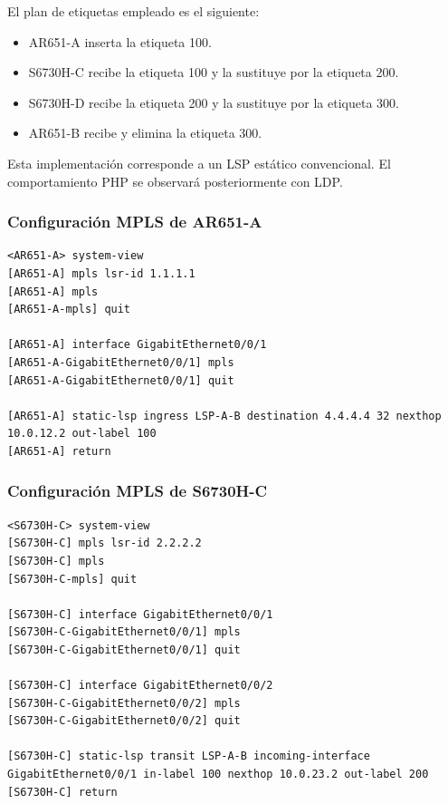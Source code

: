 El plan de etiquetas empleado es el siguiente:

\begin{itemize}
    \item AR651-A inserta la etiqueta 100.
    \item S6730H-C recibe la etiqueta 100 y la sustituye por la etiqueta 200.
    \item S6730H-D recibe la etiqueta 200 y la sustituye por la etiqueta 300.
    \item AR651-B recibe y elimina la etiqueta 300.
\end{itemize}

Esta implementación corresponde a un LSP estático convencional. El
comportamiento PHP se observará posteriormente con LDP.

\subsubsection{Configuración MPLS de AR651-A}

\begin{lstlisting}[style=terminal]
<AR651-A> system-view
[AR651-A] mpls lsr-id 1.1.1.1
[AR651-A] mpls
[AR651-A-mpls] quit

[AR651-A] interface GigabitEthernet0/0/1
[AR651-A-GigabitEthernet0/0/1] mpls
[AR651-A-GigabitEthernet0/0/1] quit

[AR651-A] static-lsp ingress LSP-A-B destination 4.4.4.4 32 nexthop 10.0.12.2 out-label 100
[AR651-A] return
\end{lstlisting}

\subsubsection{Configuración MPLS de S6730H-C}

\begin{lstlisting}[style=terminal]
<S6730H-C> system-view
[S6730H-C] mpls lsr-id 2.2.2.2
[S6730H-C] mpls
[S6730H-C-mpls] quit

[S6730H-C] interface GigabitEthernet0/0/1
[S6730H-C-GigabitEthernet0/0/1] mpls
[S6730H-C-GigabitEthernet0/0/1] quit

[S6730H-C] interface GigabitEthernet0/0/2
[S6730H-C-GigabitEthernet0/0/2] mpls
[S6730H-C-GigabitEthernet0/0/2] quit

[S6730H-C] static-lsp transit LSP-A-B incoming-interface GigabitEthernet0/0/1 in-label 100 nexthop 10.0.23.2 out-label 200
[S6730H-C] return
\end{lstlisting}

